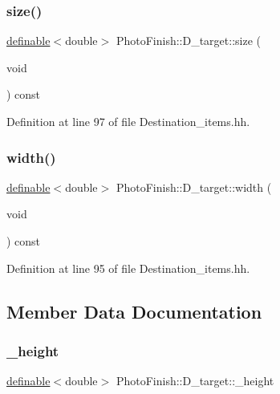\subsubsection{\texorpdfstring{size()}{size()}}
{\footnotesize\ttfamily \hyperlink{class_photo_finish_1_1definable}{definable}$<$double$>$ Photo\+Finish\+::\+D\+\_\+target\+::size (\begin{DoxyParamCaption}\item[{void}]{ }\end{DoxyParamCaption}) const\hspace{0.3cm}{\ttfamily [inline]}}



Definition at line 97 of file Destination\+\_\+items.\+hh.

\mbox{\label{class_photo_finish_1_1_d__target_a86393059cd03a3157700ca20c9e8ebaa}} 
\subsubsection{\texorpdfstring{width()}{width()}}
{\footnotesize\ttfamily \hyperlink{class_photo_finish_1_1definable}{definable}$<$double$>$ Photo\+Finish\+::\+D\+\_\+target\+::width (\begin{DoxyParamCaption}\item[{void}]{ }\end{DoxyParamCaption}) const\hspace{0.3cm}{\ttfamily [inline]}}



Definition at line 95 of file Destination\+\_\+items.\+hh.



\subsection{Member Data Documentation}
\mbox{\label{class_photo_finish_1_1_d__target_a2699d451750f763590b77babec759d2b}} 
\subsubsection{\texorpdfstring{\+\_\+height}{\_height}}
{\footnotesize\ttfamily \hyperlink{class_photo_finish_1_1definable}{definable}$<$double$>$ Photo\+Finish\+::\+D\+\_\+target\+::\+\_\+height\hspace{0.3cm}{\ttfamily [protected]}}




